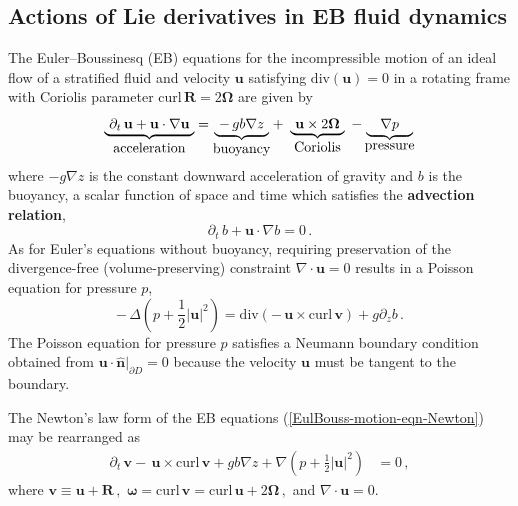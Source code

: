 \documentclass[11pt, oneside]{article}   	%
\numberwithin{equation}{section}
\theoremstyle{plain}
\theoremstyle{definition}
\theoremstyle{remark}
\newcommand{\<}{\langle}
\renewcommand{\>}{\rangle}
\begin{document}
\subsection{Actions of Lie derivatives in EB fluid dynamics}
The Euler--Boussinesq (EB) equations for the incompressible motion of an ideal
flow of a stratified fluid and velocity $\mathbf{u}$ satisfying  
$\mathrm{div}(\mathbf{u})=0$  in a rotating frame with Coriolis 
parameter $\mathrm{curl}\,\mathbf{R}=2\boldsymbol{\Omega}$ are given by
\begin{equation}
\underbrace{\
\partial_t \,\mathbf{u}
+
\mathbf{u}\cdot\nabla\mathbf{u}\
}_{\hbox{acceleration}}
=
\underbrace{\
-\,gb\nabla{z}\
}_{\hbox{buoyancy}}
+\
\underbrace{\
\mathbf{u}\times 2\boldsymbol{\Omega}\
}_{\hbox{Coriolis}}
\
-
\underbrace{\quad
\nabla p\quad
}_{\hbox{pressure}}
\label{EulBouss-motion-eqn-Newton}
\end{equation} 
where $-g\nabla{z}$ is the constant downward acceleration of gravity and $b$ is the buoyancy, a scalar function of space and time which satisfies the \textbf{ advection relation},
\begin{equation} 
\partial_t \,b
+
\mathbf{u}\cdot\nabla b 
=
0
\,.
\label{buoy-advection}
\end{equation} 
%
As for Euler's equations without buoyancy, requiring preservation of the divergence-free (volume-preserving) constraint $\nabla\cdot\mathbf{u}=0$ results in a Poisson equation for pressure $p$,  
\begin{equation} 
-\,\Delta \left(p + \frac{1}{2}|\mathbf{u}|^2\right)
=
\mathrm{div} (-\,\mathbf{u}\times\mathrm{curl}\,\mathbf{v}) 
+ g \partial_z b
\,.
\label{Lamb-pressure-eqn-buoy}
\end{equation}
The Poisson equation for pressure $p$ satisfies a Neumann boundary condition obtained from $\mathbf{u}\cdot \mathbf{\hat{n}}|_{\partial D}=0$
because the velocity $\mathbf{u}$ must be tangent to the boundary.

The Newton's law form of the EB equations (\ref{EulBouss-motion-eqn-Newton}) may be rearranged as
\begin{eqnarray} 
\partial_t \,\mathbf{v}
-\,\mathbf{u}\times\mathrm{curl}\,\mathbf{v} 
+
gb\nabla{z}
+
\nabla \left(p + \frac{1}{2}|\mathbf{u}|^2\right)
&=
0
\,,
\label{EulBous-motion-eqn-Lie}
\end{eqnarray} 
where
$ 
\mathbf{v}
\equiv
\mathbf{u}+\mathbf{R}
\,,$
$
\boldsymbol{\omega}=\mathrm{curl}\,\mathbf{v}=\mathrm{curl}\,\mathbf{u}+2\boldsymbol{\Omega}
\,,
$
and $\nabla\cdot\mathbf{u}=0$.
\end{document}
